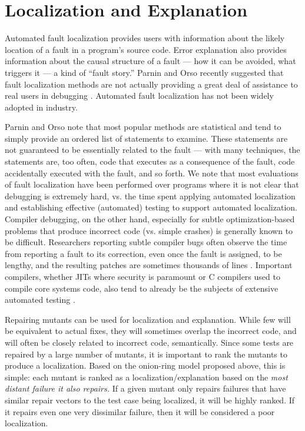\section{Localization and Explanation}

Automated fault localization \cite{FaultSurvey,Jones2002} provides users with
information about the likely location of a fault in a program's source
code.  Error explanation \cite{GroceError} also provides information
about the causal structure of a fault --- how it can be avoided, what
triggers it --- a kind of ``fault story.''  Parnin and Orso recently
suggested that fault localization methods are not actually providing a
great deal of assistance to real users in debugging \cite{AutoHelp}.
Automated fault localization has not been widely adopted in industry.

Parnin and Orso note that most popular methods are
statistical and tend to simply provide an ordered list of statements
to examine.  These statements are not guaranteed to be essentially
related to the fault --- with many techniques, the statements are,
too often, code that executes as a consequence of the fault, code
accidentally executed with the fault, and so forth.  We note that most
evaluations of fault localization have been performed over programs
where it is not clear that debugging is extremely hard, vs. the time
spent applying automated localization and establishing effective
(automated) testing to support automated localization.  Compiler
debugging, on the other hand, especially for subtle optimization-based
problems that produce incorrect code (vs. simple crashes) is generally
known to be difficult.
Researchers reporting subtle compiler bugs often observe the time from
reporting a fault to its correction, even once the fault is assigned,
to be lengthy, and the resulting patches are sometimes thousands of
lines \cite{PLDI13}.  Important compilers, whether JITs where security is paramount
or C compilers used to compile core systems code, also tend to already
be the
subjects of extensive automated testing \cite{jsfunfuzz,csmith}.



Repairing mutants can be used for localization and
explanation.  While few will be equivalent to actual fixes, they
will sometimes overlap the incorrect code, and will often be closely
related to incorrect code, semantically.  Since some tests are
repaired by a large number of mutants, it is important to rank the
mutants to produce a localization.  Based on the onion-ring model proposed above, this is simple: each mutant is ranked as
a localization/explanation based on the \emph{most distant failure it also
  repairs.}  If a given mutant only repairs failures that have similar
repair vectors to the test case being localized, it will be highly
ranked.  If it repairs even one very dissimilar failure, then it will
be considered a poor localization.

